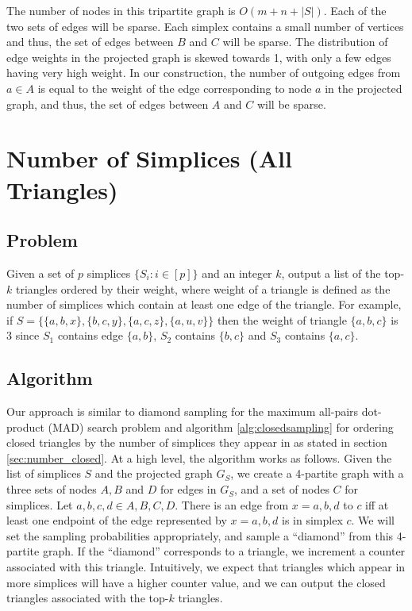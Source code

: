 \documentclass{article}
\begin{document}
The number of nodes in this tripartite graph is $O(m + n + |S|)$.
Each of the two sets of edges will be sparse.
Each simplex contains a small number of vertices and thus,
the set of edges between $B$ and $C$ will be sparse.
The distribution of edge weights in the projected graph is skewed
towards 1, with only a few edges having very high weight. In our construction,
the number of outgoing edges from $a \in A$ is equal to the weight
of the edge corresponding to node $a$ in the projected graph,
and thus, the set of edges between $A$ and $C$ will be sparse.



\section{Number of Simplices (All Triangles)}

\subsection{Problem}
Given a set of $p$ simplices $\{S_i : i \in [p]\}$ and
an integer $k$, output a list of the top-$k$
triangles ordered by their weight, where weight of a 
triangle is defined as the number of simplices which
contain at least one edge of the triangle.
For example, if $S = \{\{a,b,x\}, \{b,c,y\}, 
\{a,c,z\}, \{a,u,v\} \}$ then the weight of triangle $\{a,b,c\}$ is
3 since $S_1$ contains edge $\{a,b\}$, $S_2$ contains
$\{b,c\}$ and $S_3$ contains $\{a,c\}$.


\subsection{Algorithm}
Our approach is similar to diamond sampling for the maximum
all-pairs dot-product (MAD) search problem \cite{diamond} and
algorithm \ref{alg:closedsampling} for ordering closed
triangles by the number of simplices they appear in as stated
in section \ref{sec:number_closed}.
At a high level, the algorithm works as follows. Given the list
of simplices $S$ and the projected graph $G_S$, we create a 4-partite
graph with a three sets of nodes $A,B$ and $D$ for edges 
in $G_S$, and a set of nodes $C$ for simplices. Let
$a,b,c,d \in A,B,C,D$. There is an edge from $x = a,b,d$
to $c$ iff at least one endpoint of the edge represented by
$x = a,b,d$ is in simplex $c$.  We will set the sampling probabilities
appropriately, and sample a ``diamond'' from this 4-partite 
graph. If the ``diamond'' corresponds to a triangle, we
increment a counter associated with this triangle. Intuitively,
we expect that triangles which appear in more simplices will have
a higher counter value, and we can output the closed triangles
associated with the top-$k$ triangles.
\end{document}
